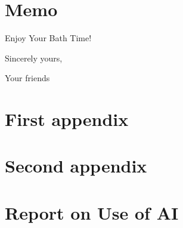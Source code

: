 \documentclass{mcmthesis}
\begin{document}
	
	
	\newpage
	\section*{Memo} %
	
	\begin{letter}{Enjoy Your Bath Time!}
		
		
		\vspace{\parskip}
		
		Sincerely yours,
		
		Your friends
		
	\end{letter}
	
	
	
	
	
	
	
	
	
	
	\newpage
	\printbibliography
	
	
	
	
	\begin{appendices}
		\section{First appendix}
		\section{Second appendix}
	\end{appendices}
	
	
	
	
	\newpage
	\setcounter{lastpage}{\value{page}}
	\thispagestyle{empty} 
	
	\section*{Report on Use of AI}
	
\end{document}
